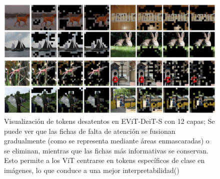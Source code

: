 \begin{figure}[H]
	\begin{center}
		\includegraphics[width=1\textwidth]{2/figures/vt6.jpeg}
		\caption{Visualización de tokens desatentos en EViT-DeiT-S con 12 capas; Se puede ver que las fichas de falta de atención se fusionan gradualmente (como se representa mediante áreas enmascaradas) o se eliminan, mientras que las fichas más informativas se conservan. Esto permite a los ViT centrarse en tokens específicos de clase en imágenes, lo que conduce a una mejor interpretabilidad(\cite{tecnica1})}
	\end{center}
\end{figure}



